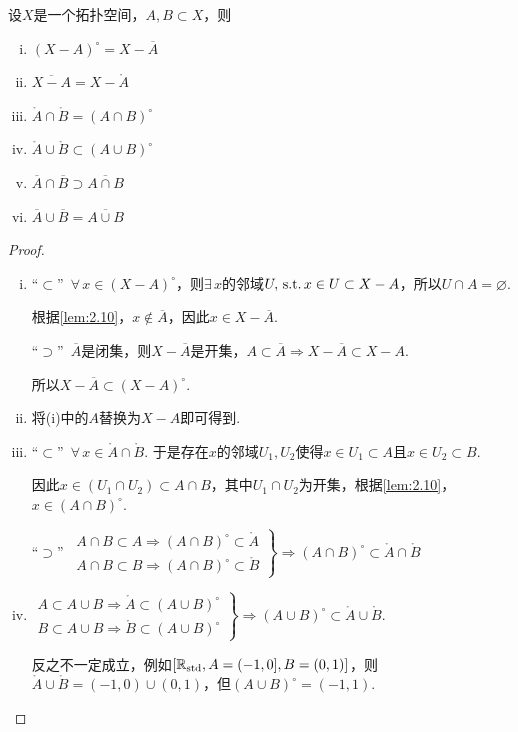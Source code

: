 \vspace{5 em}
\begin{proposition}[][prop:2.9]
    设$X$是一个拓扑空间，$A,B\subset X$，则
    \begin{enumerate}[(i)]
        \item ${(X-A)}^{\circ} = X-\overline{A}$
        \item $\overline{X-A} = X-\mathring{A}$
        \item $\mathring{A}\cap\mathring{B} = {(A\cap B)}^{\circ}$
        \item $\mathring{A}\cup\mathring{B} \subset {(A\cup B)}^{\circ}$
        \item $\overline{A}\cap\overline{B} \supset \overline{A\cap B}$
        \item $\overline{A}\cup\overline{B} = \overline{A\cup B}$
    \end{enumerate}
\end{proposition}
\begin{proof}
    \begin{enumerate}[(i)]
        \item “$\subset$”\, $\forall\, x\in (X-A)^\circ$，则$\exists\, x$的邻域$U,\operatorname{\,\text{s.t.}} x\in U\subset X-A$，所以$U\cap A=\varnothing$.\par
        根据\cref{lem:2.10}，$x\notin\overline{A}$，因此$x\in X-\overline{A}$.\par
        “$\supset$”\, $\overline{A}$是闭集，则$X-\overline{A}$是开集，$A\subset\overline{A}\Rightarrow X-\overline{A}\subset X-A$.\par
        所以$X-\overline{A}\subset (X-A)^\circ$.
        \item 将(i)中的$A$替换为$X-A$即可得到.
        \item “$\subset$”\, $\forall\,x\in\mathring{A}\cap\mathring{B}$. 于是存在$x$的邻域$U_1, U_2$使得$x\in U_1\subset A$且$x\in U_2\subset B$.\par
        因此$x\in (U_1\cap U_2)\subset A\cap B$，其中$U_1\cap U_2$为开集，根据\cref{lem:2.10}，$x\in{(A\cap B)}^\circ$.\par
        “$\supset$”\, $\left.\begin{array}{lll}
            A\cap B\subset A \Rightarrow {(A\cap B)}^\circ \subset\mathring{A} \\
            A\cap B\subset B \Rightarrow {(A\cap B)}^\circ \subset\mathring{B}
        \end{array}\right\}\Rightarrow (A\cap B)^\circ\subset \mathring{A}\cap\mathring{B}$
        \item $\left.\begin{array}{lll}
            A\subset A\cup B \Rightarrow \mathring{A}\subset{(A\cup B)^\circ} \\
            B\subset A\cup B \Rightarrow \mathring{B}\subset{(A\cup B)}^\circ
        \end{array}\right\}\Rightarrow (A\cup B)^\circ\subset \mathring{A}\cup\mathring{B}$.\par
        反之不一定成立，例如$[\mathbb{R}_\mathrm{std},A=(-1,0],B=(0,1)]$，则$\mathring{A}\cup\mathring{B}=(-1,0)\cup(0,1)$，但$(A\cup B)^\circ=(-1,1)$.
    \end{enumerate}
\end{proof}

